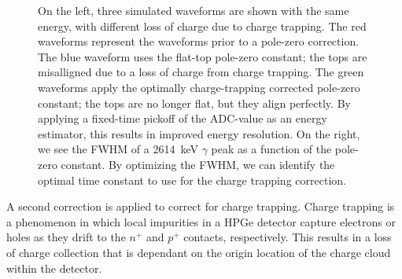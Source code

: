 \documentclass[/main.tex]{subfiles}
\begin{document}
\begin{figure}
  \centering
  \caption[Charge Trapping Correction]{\label{fig:ctcorr}
    On the left, three simulated waveforms are shown with the same energy, with different loss of charge due to charge trapping. The red waveforms represent the waveforms prior to a pole-zero correction. The blue waveform uses the flat-top pole-zero constant; the tops are misalligned due to a loss of charge from charge trapping. The green waveforms apply the optimally charge-trapping corrected pole-zero constant; the tops are no longer flat, but they align perfectly. By applying a fixed-time pickoff of the ADC-value as an energy estimator, this results in improved energy resolution. On the right, we see the FWHM of a 2614~keV $\gamma$ peak as a function of the pole-zero constant. By optimizing the FWHM, we can identify the optimal time constant to use for the charge trapping correction. 
  }
\end{figure}
A second correction is applied to correct for charge trapping.
Charge trapping is a phenomenon in which local impurities in a HPGe detector capture electrons or holes as they drift to the $n^+$ and $p^+$ contacts, respectively.
This results in a loss of charge collection that is dependant on the origin location of the charge cloud within the detector.
\end{document}
